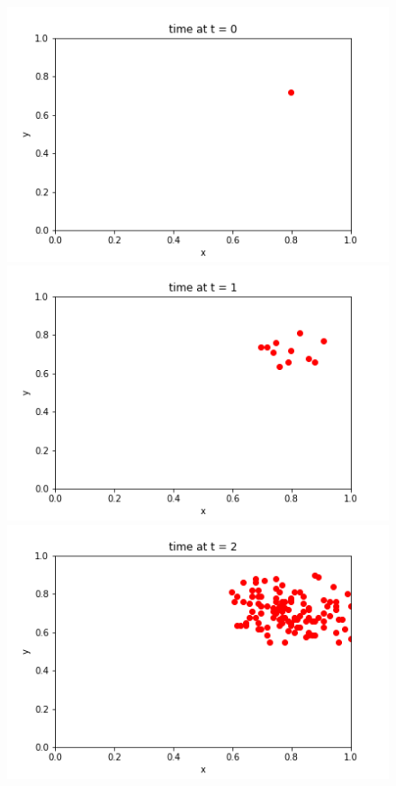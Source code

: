 \documentclass[12pt, reqno]{amsart}
\begin{document}
        \begin{figure}[h]
        \centering
        \begin{minipage}[b]{0.45 \textwidth}
            \includegraphics[width=\textwidth]{./discrete/infected_grid0.png}
            \caption{}
            \label{fig:day0}
        \end{minipage}
        \hfill
        \begin{minipage}[b]{0.45 \textwidth}
            \includegraphics[width=\textwidth]{./discrete/infected_grid1.png}
            \caption{}
            \label{fig:day1}
        \end{minipage}
        \centering
        \begin{minipage}[b]{0.45 \textwidth}
            \includegraphics[width=\textwidth]{./discrete/infected_grid2.png}

\end{minipage}
\end{figure}
\end{document}
